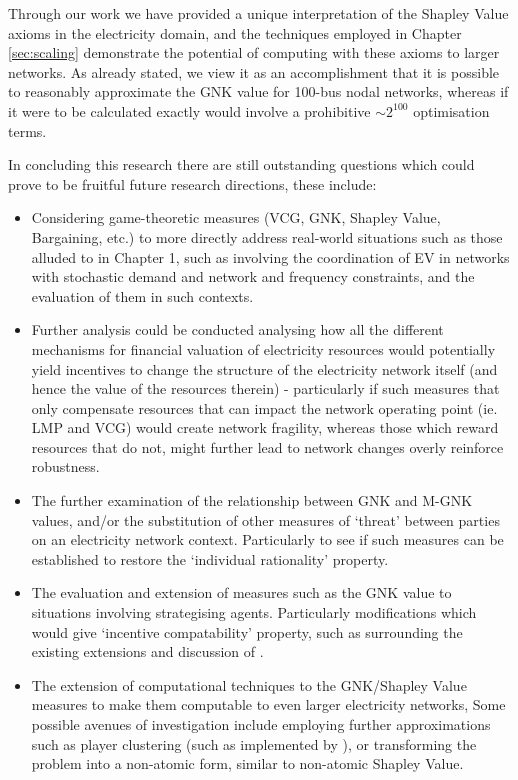 Through our work we have provided a unique interpretation of the Shapley Value axioms in the electricity domain, and the techniques employed in Chapter \ref{sec:scaling} demonstrate the potential of computing with these axioms to larger networks. As already stated, we view it as an accomplishment that it is possible to reasonably approximate the GNK value for 100-bus nodal networks,
whereas if it were to be calculated exactly would involve a prohibitive $\sim 2^{100}$ optimisation terms.

In concluding this research there are still outstanding questions which could prove to be fruitful future research directions, these include:
\begin{itemize}
\item	Considering game-theoretic measures (VCG, GNK, Shapley Value, Bargaining, etc.) to more directly address real-world situations such as those alluded to in Chapter 1, such as involving the coordination of EV in networks with stochastic demand and network and frequency constraints, and the evaluation of them in such contexts.
\item	Further analysis could be conducted analysing how all the different mechanisms for financial valuation of electricity resources would potentially yield incentives to change the structure of the electricity network itself (and hence the value of the resources therein) - particularly if such measures that only compensate resources that can impact the network operating point (ie. LMP and VCG) would create network fragility, whereas those which reward resources that do not, might further lead to network changes overly reinforce robustness.
\item	The further examination of the relationship between GNK and M-GNK values, and/or the substitution of other measures of `threat' between parties on an electricity network context. Particularly to see if such measures can be established to restore the `individual rationality' property.
\item	The evaluation and extension of measures such as the GNK value to situations involving strategising agents. Particularly modifications which would give `incentive compatability' property, such as surrounding the existing extensions and discussion of \cite{myerson1,Salamanca2019}.
\item	The extension of computational techniques to the GNK/Shapley Value measures to make them computable to even larger electricity networks, Some possible avenues of investigation include employing further approximations such as player clustering (such as implemented by \cite{DBLP:journals/corr/abs-1903-10965}), or transforming the problem into a non-atomic form, similar to non-atomic Shapley Value.

\end{itemize}
